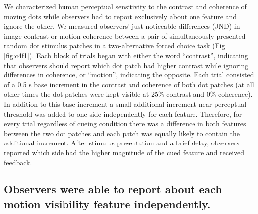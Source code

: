 \documentclass{report}
\begin{document}
We characterized human perceptual sensitivity to the contrast and coherence of moving dots while observers had to report exclusively about one feature and ignore the other. We measured observers’ just-noticeable differences (JND) in image contrast or motion coherence between a pair of simultaneously presented random dot stimulus patches in a two-alternative forced choice task (Fig \ref{fig:c4f1}). Each block of trials began with either the word ``contrast'', indicating that observers should report which dot patch had higher contrast while ignoring differences in coherence, or ``motion'', indicating the opposite. Each trial consisted of a 0.5 s base increment in the contrast and coherence of both dot patches (at all other times the dot patches were kept visible at 25\% contrast and 0\% coherence). In addition to this base increment a small additional increment near perceptual threshold was added to one side independently for each feature. Therefore, for every trial regardless of cueing condition there was a difference in both features between the two dot patches and each patch was equally likely to contain the additional increment. After stimulus presentation and a brief delay, observers reported which side had the higher magnitude of the cued feature and received feedback.

\subsection{Observers were able to report about each motion visibility feature independently.}
\end{document}
